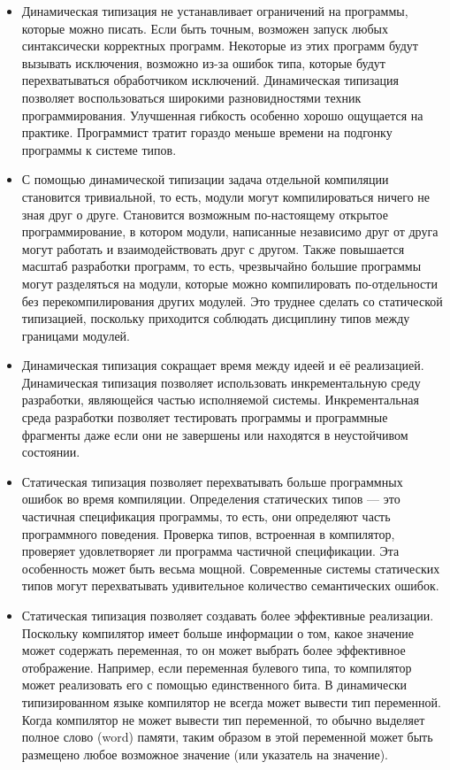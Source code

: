 \begin{itemize}

  \item{Динамическая типизация не устанавливает ограничений на программы, которые можно писать. Если быть точным, возможен запуск любых синтаксически корректных программ. Некоторые из этих программ будут вызывать исключения, возможно из-за ошибок типа, которые будут перехватываться обработчиком исключений. Динамическая типизация позволяет воспользоваться широкими разновидностями техник программирования. Улучшенная гибкость особенно хорошо ощущается на практике. Программист тратит гораздо меньше времени на подгонку программы к системе типов.}

\item{С помощью динамической типизации задача отдельной компиляции становится тривиальной, то есть, модули могут компилироваться ничего не зная друг о друге. Становится возможным по-настоящему открытое программирование, в котором модули, написанные независимо друг от друга могут работать и взаимодействовать друг с другом. Также повышается масштаб разработки программ, то есть, чрезвычайно большие программы могут разделяться на модули, которые можно компилировать по-отдельности без перекомпилирования других модулей. Это труднее сделать со статической типизацией, поскольку приходится соблюдать дисциплину типов между границами модулей.}

\item{Динамическая типизация сокращает время между идеей и её реализацией. Динамическая типизация позволяет использовать инкрементальную среду разработки, являющейся частью исполняемой системы. Инкрементальная среда разработки позволяет тестировать программы и программные фрагменты даже если они не завершены или находятся в неустойчивом состоянии.}

\item{Статическая типизация позволяет перехватывать больше программных ошибок во время компиляции. Определения статических типов --- это частичная спецификация программы, то есть, они определяют часть программного поведения. Проверка типов, встроенная в компилятор, проверяет удовлетворяет ли программа частичной спецификации. Эта особенность может быть весьма мощной. Современные системы статических типов могут перехватывать удивительное количество семантических ошибок.}

\item{Статическая типизация позволяет создавать более эффективные реализации. Поскольку компилятор имеет больше информации о том, какое значение может содержать переменная, то он может выбрать более эффективное отображение. Например, если переменная булевого типа, то компилятор может реализовать его с помощью единственного бита. В динамически типизированном языке компилятор не всегда может вывести тип переменной. Когда компилятор не может вывести тип переменной, то обычно выделяет полное слово (word) памяти, таким образом в этой переменной может быть размещено любое возможное значение (или указатель на значение).}


\end{itemize}
